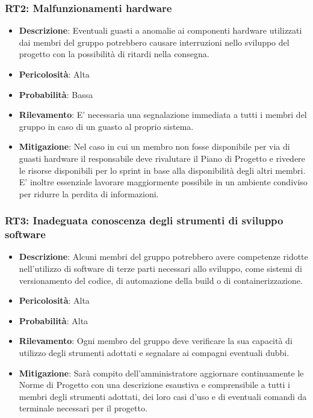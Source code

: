 \documentclass[a4paper, 12pt]{article}
\begin{document}
\subsubsection{RT2: Malfunzionamenti hardware}
\begin{itemize}
    \item \textbf{Descrizione}: Eventuali guasti a anomalie ai componenti hardware utilizzati dai membri del gruppo potrebbero causare 
    interruzioni nello sviluppo del progetto con la possibilità di ritardi nella consegna.
    \item \textbf{Pericolosità}: Alta
    \item \textbf{Probabilità}: Bassa
    \item \textbf{Rilevamento}: E' necessaria una segnalazione immediata a tutti i membri del gruppo in caso di un guasto al proprio sistema.
    \item \textbf{Mitigazione}: Nel caso in cui un membro non fosse disponibile per via di guasti hardware il responsabile deve 
    rivalutare il Piano di Progetto e rivedere le risorse disponibili per lo sprint in base alla disponibilità degli altri membri.
    E' inoltre essenziale lavorare maggiormente possibile in un ambiente condiviso per ridurre la perdita di informazioni.
\end{itemize}
\subsubsection{RT3: Inadeguata conoscenza degli strumenti di sviluppo software}
\begin{itemize}
    \item \textbf{Descrizione}: Alcuni membri del gruppo potrebbero avere competenze ridotte nell'utilizzo di software di terze parti necessari allo sviluppo, 
    come sistemi di versionamento del codice, di automazione della build o di containerizzazione. 
    \item \textbf{Pericolosità}: Alta
    \item \textbf{Probabilità}: Alta
    \item \textbf{Rilevamento}: Ogni membro del gruppo deve verificare la sua capacità di utilizzo degli strumenti adottati e segnalare ai compagni
    eventuali dubbi.
    \item \textbf{Mitigazione}: Sarà compito dell'amministratore aggiornare continuamente le Norme di Progetto con una descrizione esaustiva
    e comprensibile a tutti i membri degli strumenti adottati, dei loro casi d'uso e di eventuali comandi da terminale necessari per il progetto.
\end{itemize}
\end{document}
